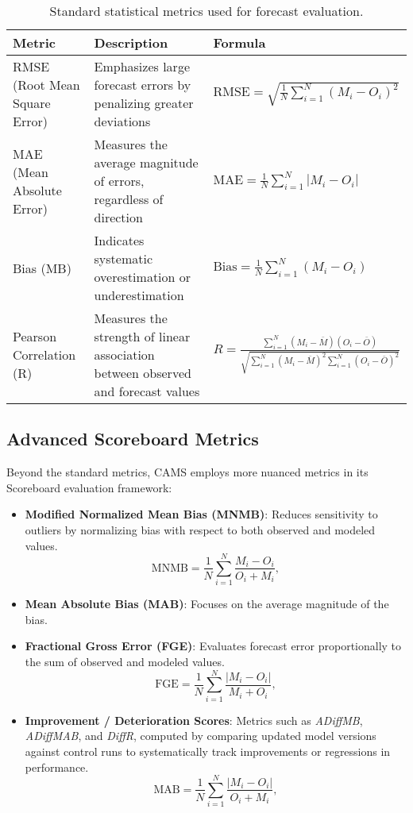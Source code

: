 \begin{table}[h!]
	\centering
	\begin{tabular}{p{2.5cm} p{5cm} p{6cm}}
		\hline
		\textbf{Metric} & \textbf{Description} & \textbf{Formula} \\
		\hline
		RMSE (Root Mean Square Error) & Emphasizes large forecast errors by penalizing greater deviations & 
		$\mathrm{RMSE} = \sqrt{\frac{1}{N} \sum_{i=1}^{N} (M_i - O_i)^2}$ \\
		
		MAE (Mean Absolute Error) & Measures the average magnitude of errors, regardless of direction & 
		$\mathrm{MAE} = \frac{1}{N} \sum_{i=1}^{N} \left| M_i - O_i \right|$ \\
		
		Bias (MB) & Indicates systematic overestimation or underestimation & 
		$\mathrm{Bias} = \frac{1}{N} \sum_{i=1}^{N} (M_i - O_i)$ \\
		
		Pearson Correlation (R) & Measures the strength of linear association between observed and forecast values & 
		$R = \frac{\sum_{i=1}^{N} (M_i - \overline{M})(O_i - \overline{O})}{\sqrt{\sum_{i=1}^{N} (M_i - \overline{M})^2 \sum_{i=1}^{N} (O_i - \overline{O})^2}}$ \\
		\hline
	\end{tabular}
	\caption{Standard statistical metrics used for forecast evaluation.}
	\label{tab:stats_metrics}
\end{table}

\subsection{Advanced Scoreboard Metrics}

Beyond the standard metrics, CAMS employs more nuanced metrics in its Scoreboard evaluation framework:

\begin{itemize}
	\item \textbf{Modified Normalized Mean Bias (MNMB)}: Reduces sensitivity to outliers by normalizing bias with respect to both observed and modeled values.
	\[
	\mathrm{MNMB} = \frac{1}{N} \sum_{i=1}^{N} \frac{M_i - O_i}{O_i + M_i},
	\]
	\item \textbf{Mean Absolute Bias (MAB)}: Focuses on the average magnitude of the bias.
	\item \textbf{Fractional Gross Error (FGE)}: Evaluates forecast error proportionally to the sum of observed and modeled values.
	\[
	\mathrm{FGE} = \frac{1}{N} \sum_{i=1}^{N} \frac{ | M_i - O_i | }{ M_i + O_i },
	\]
	\item \textbf{Improvement / Deterioration Scores}: Metrics such as \emph{ADiffMB}, \emph{ADiffMAB}, and \emph{DiffR}, computed by comparing updated model versions against control runs to systematically track improvements or regressions in performance.
	\[
	\mathrm{MAB} = \frac{1}{N} \sum_{i=1}^{N} \frac{|M_i - O_i|}{O_i + M_i},
	\]
	
\end{itemize}

